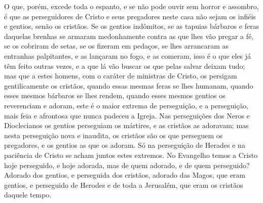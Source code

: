 O que, porém, excede toda o espanto, e se não pode ouvir sem horror e
assombro, é que as perseguidores de Cristo e seus pregadores neste casa
não sejam os infiéis e gentios, senão os cristãos. Se os gentios
indômitos, se as tapuias bárbaros e feras daquelas brenhas se armaram
medonhamente contra as que lhes vão pregar a fé, se os cobriram de
setas, se os fizeram em pedaços, se lhes arrancaram as entranhas
palpitantes, e as lançaram no fogo, e as comeram, isso é o que eles já
têm feito outras vezes, e a que lá vão buscar os que pelas salvar deixam
tudo; mas que a estes homens, com o caráter de ministras de Cristo, os
persigam gentilicamente os cristãos, quando essas mesmas feras se lhes
humanam, quando esses mesmos bárbaros se lhes rendem, quando esses
mesmos gentios os reverenciam e adoram, este é o maior extrema de
perseguição, e a perseguição, mais feia e afrontosa que nunca padeceu a
Igreja. Nas perseguições dos Neros e Dioclecianos os gentios perseguiam
os mártires, e as cristãos as adoravam; mas nesta perseguição nova e
inaudita, os cristãos são os que perseguem os pregadores, e os gentios
as que os adoram. Só na perseguição de Herades e na paciência de Cristo
se acham juntos estes extremos. No Evangelho temos a Cristo hoje
perseguido, e hoje adorada, mas de quem adorado, e de quem perseguido?
Adorado dos gentios, e perseguida dos cristãos, adorado das Magos, que
eram gentios, e perseguido de Herodes e de toda a Jerusalém, que eram os
cristãos daquele tempo.

